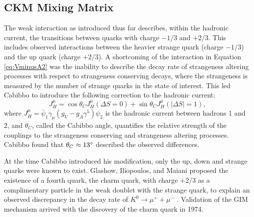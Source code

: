 \subsection{CKM Mixing Matrix}
The weak interaction as introduced thus far describes, within the hadronic current, the transitions
between quarks with charge $-1/3$ and $+2/3$. This includes observed interactions between the heavier
strange quark (charge $-1/3$) and the up quark (charge $+2/3$). 
A shortcoming of the interaction in Equation \ref{eq:VminusA2} was the inability to describe
the decay rate of strangeness altering processes with respect to strangeness conserving
decays, where the strangeness is measured by the number of strange quarks in the state of interest.
This led Cabibbo \cite{cabibbo1963} to introduce the following correction to the hadronic current:
%
\begin{equation}
  J^\mu_H = \cos\theta_C J^\mu_H(\Delta S=0) + \sin\theta_C J^\mu_H(|\Delta S|=1),
  \label{eq:cabibbo}
\end{equation}
%
where $J^\mu_H = \bar{\psi}_1 \gamma_\mu(g_V-g_A\gamma^5)\psi_2$ is the hadronic current between
hadrons 1 and 2, and $\theta_C$, called the Cabibbo angle, quantifies the relative strength
of the couplings to the strangeness conserving and strangeness altering processes.
Cabibbo found that $\theta_C \approx 13\degree$ described the observed differences.

At the time Cabibbo introduced his modification, only the up, down and strange quarks were known
to exist. Glashow, Iliopoulos, and Maiani proposed the existence of a fourth quark, the charm quark,
with charge $+2/3$ as a complimentary particle in the weak doublet with the strange quark, to explain
an observed discrepancy in the decay rate of $K^0 \rightarrow \mu^+ + \mu^-$ \cite{glashow1970}.
Validation of the GIM mechanism arrived with the discovery of the
charm quark in 1974.

